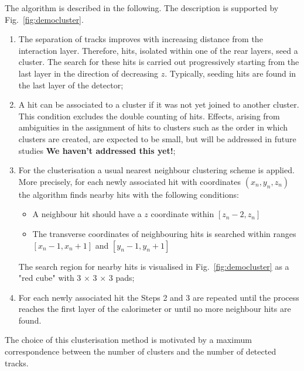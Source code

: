 
The algorithm is described in the following. The description is supported by Fig.\ \ref{fig:democluster}.
\begin{enumerate}
	\item The separation of tracks improves with increasing distance from the interaction layer. Therefore, hits, isolated within one of the rear layers, seed a cluster. The search for these hits is carried out progressively starting from the last layer in the direction of decreasing $z$.
	Typically, seeding hits are found in the last layer of the detector;
	\item A hit can be associated to a cluster if it was not yet joined to another cluster. This condition excludes the double counting of hits. Effects, arising from ambiguities in the assignment of hits to clusters such as the order in which clusters are created, are expected to be small, but will be addressed in future studies {\bf We haven't addressed this yet!};
	\item For the clusterisation a usual nearest neighbour clustering scheme is applied. More precisely, for each newly associated hit with coordinates $(x_n,y_n,z_n)$ the algorithm finds nearby hits with the following conditions:
	\begin{itemize}
		\item A neighbour hit should have a $z$ coordinate within $[z_n-2,z_n]$
		\item The transverse coordinates of neighbouring hits is searched within ranges $[x_n-1,x_n+1]$ and $[y_n-1,y_n+1]$
	\end{itemize}
	The search region for nearby hits is visualised  in Fig.~\ref{fig:democluster} as a "red cube" with 3 $\times$ 3 $\times$ 3 pads; 
	\item  For each newly associated hit the Steps 2 and 3 are repeated until the process reaches the first layer of the calorimeter or until no more neighbour hits are found.
\end{enumerate}
The choice of this clusterisation method is motivated by a maximum correspondence between the number of clusters and the number of detected tracks.

